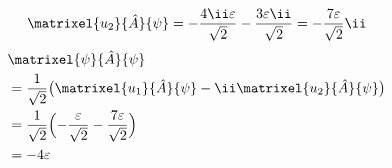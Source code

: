 \[ \matrixel{u_{2}}{\hat{A}}{\psi}=-\frac{4\ii\varepsilon}{\sqrt{2}}-\frac{3\varepsilon\ii}{\sqrt{2}}=-\frac{7\varepsilon}{\sqrt{2}}\ii \]
\begin{align*}
&\matrixel{\psi}{\hat{A}}{\psi}\\
&=\frac{1}{\sqrt{2}}\bigl(\matrixel{u_{1}}{\hat{A}}{\psi}-\ii\matrixel{u_{2}}{\hat{A}}{\psi}\bigr)\\
&=\frac{1}{\sqrt{2}}\Bigl(-\frac{\varepsilon}{\sqrt{2}}-\frac{7\varepsilon}{\sqrt{2}}\Bigr)\\
&=-4\varepsilon
\end{align*}
